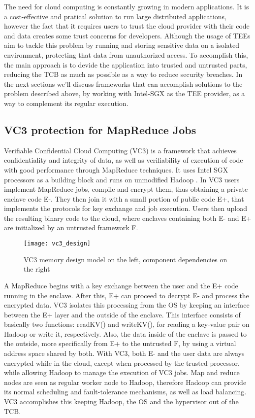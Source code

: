 The need for cloud computing is constantly growing in modern applications. It is a cost-effective and pratical solution to run large distributed applications, however the fact that it requires users to trust the cloud provider with their code and data creates some trust concerns for developers.
Although the usage of TEEs aim to tackle this problem by running and storing sensitive data on a isolated environment, protecting that data from unauthorized access. To accomplish this, the main approach is to devide the application into trusted and untrusted parts, reducing the TCB as much as possible as a way to reduce security breaches. 
In the next sections we'll discuss frameworks that can accomplish solutions to the problem described above, by working with Intel-SGX as the TEE provider, as a way to complement its regular execution.




\subsection{VC3 protection for MapReduce Jobs}

Verifiable Confidential Cloud Computing (VC3) \cite{vc3Paper} is a framework that achieves confidentiality and integrity of data, as well as verifiability of execution of code with good performance through MapReduce \cite{mapReduce} techniques. It uses Intel SGX processors as a building block and runs on unmodified Hadoop \cite{hadoop}.
In VC3 users implement MapReduce jobs, compile and encrypt them, thus obtaining a private enclave code E-. They then join it with a small portion of public code E+, that implements the protocols for key exchange and job execution.
Users then upload the resulting binary code to the cloud, where enclaves containing both E- and E+ are initialized by an untrusted framework F. 

\begin{figure}[htbp]
	\centering
	{\texttt{[image: vc3\_design]}}%
	\caption{VC3 memory design model on the left, component dependencies on the right}
\end{figure}

A MapReduce begins with a key exchange between the user and the E+ code running in the enclave. After this, E+ can proceed to decrypt E- and process the encrypted data. VC3 isolates this processing from the OS by keeping an interface between the E+ layer and the outside of the enclave. This interface consists of basically two functions: readKV() and writeKV(), for reading a key-value pair on Hadoop or write it, respectively. Also, the data inside of the enclave is passed to the outside, more specifically from E+ to the untrusted F, by using a virtual address space shared by both.
With VC3, both E- and the user data are always encrypted while in the cloud, except when processed by the trusted processor, while allowing Hadoop to manage the execution of VC3 jobs. Map and reduce nodes are seen as regular worker node to Hadoop, therefore Hadoop can provide its normal scheduling and fault-tolerance mechanisms, as well as load balancing. VC3 accomplishes this keeping Hadoop, the OS and the hypervisor out of the TCB.




